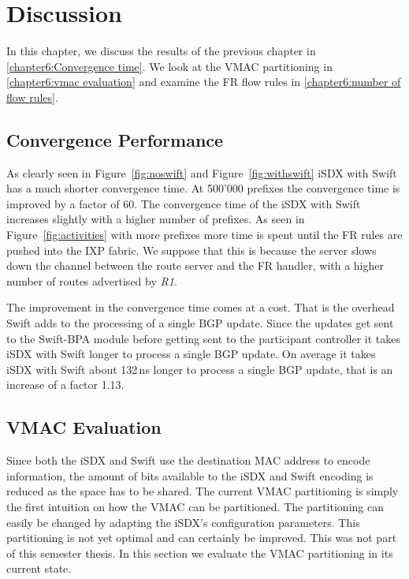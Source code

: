 \chapter{\label{chapter6}Discussion}

In this chapter, we discuss the results of the previous chapter in \ref{chapter6:Convergence time}. We look at the VMAC partitioning in \ref{chapter6:vmac evaluation} and examine the FR flow rules in \ref{chapter6:number of flow rules}.

\section{\label{chapter6:Convergence time}Convergence Performance}

As clearly seen in Figure~\ref{fig:noswift} and Figure~\ref{fig:withswift} iSDX with Swift has a much shorter convergence time. At 500'000 prefixes the convergence time is improved by a factor of 60. The convergence time of the iSDX with Swift increases slightly with a higher number of prefixes. As seen in Figure~\ref{fig:activities} with more prefixes more time is spent until the FR rules are pushed into the IXP fabric. We suppose that this is because the server slows down the channel between the route server and the FR handler, with a higher number of routes advertised by \emph{R1}.

The improvement in the convergence time comes at a cost. That is the overhead Swift adds to the processing of a single BGP update. Since the updates get sent to the Swift-BPA module before getting sent to the participant controller it takes iSDX with Swift longer to process a single BGP update. On average it takes iSDX with Swift about 132\,ns longer to process a single BGP update, that is an increase of a factor 1.13. 

\section{\label{chapter6:vmac evaluation}VMAC Evaluation}

Since both the iSDX and Swift use the destination MAC address to encode information, the amount of bits available to the iSDX and Swift encoding is reduced as the space has to be shared. The current VMAC partitioning is simply the first intuition on how the VMAC can be partitioned. The partitioning can easily be changed by adapting the iSDX's configuration parameters. This partitioning is not yet optimal and can certainly be improved. This was not part of this semester thesis. In this section we evaluate the VMAC partitioning in its current state.

